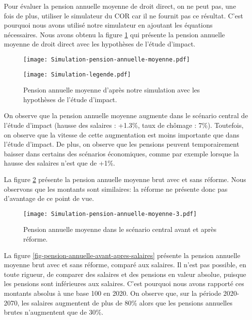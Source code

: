 \documentclass[10pt]{article}
\begin{document}
Pour évaluer la pension annuelle moyenne de droit direct, on ne peut pas, 
une fois de plus, utiliser le simulateur du COR car
il ne fournit pas ce résultat.
C'est pourquoi nous avons utilisé notre simulateur en ajoutant les équations 
nécessaires. 
Nous avons obtenu la figure \ref{fig-pension-annuelle-simulation} qui présente 
la pension annuelle moyenne de droit direct avec les hypothèses de l'étude d'impact. 

\begin{figure}
\begin{center}
\texttt{[image: Simulation-pension-annuelle-moyenne.pdf]}

\texttt{[image: Simulation-legende.pdf]}
\end{center}

\caption{Pension annuelle moyenne d'après notre simulation 
avec les hypothèses de l'étude d'impact.}
\label{fig-pension-annuelle-simulation}
\end{figure}

On observe que la pension annuelle moyenne augmente dans le scénario central de 
l'étude d'impact (hausse des salaires : +1.3\%, taux de chômage : 7\%). 
Toutefois, on observe que la vitesse de cette augmentation est moins importante 
que dans l'étude d'impact. 
De plus, on observe que les pensions peuvent temporairement baisser dans certains 
des scénarios économiques, comme par exemple lorsque la hausse des salaires n'est que 
de +1\%. 

La figure \ref{fig-pension-annuelle-simulation-vs-COR} présente la pension 
annuelle moyenne brut avec et sans réforme. 
Nous observons que les montants sont similaires: la réforme ne présente donc pas 
d'avantage de ce point de vue. 

\begin{figure}
\begin{center}
\texttt{[image: Simulation-pension-annuelle-moyenne-3.pdf]}
\end{center}
\caption{Pension annuelle moyenne dans le scénario central 
avant et après réforme.}
\label{fig-pension-annuelle-simulation-vs-COR}
\end{figure}

La figure \ref{fig-pension-annuelle-avant-apres-salaires} présente la pension 
annuelle moyenne brut avec et sans réforme, comparé aux salaires. 
Il n'est pas possible, en toute rigueur, de comparer des salaires et 
des pensions en valeur absolue, puisque les pensions sont inférieures aux 
salaires. 
C'est pourquoi nous avons rapporté ces montants absolus à une base 100 en 2020.  
On observe que, sur la période 2020-2070, les salaires augmentent de plus de 80\% 
alors que les pensions annuelles brutes n'augmentent que de 30\%. 
\end{document}
